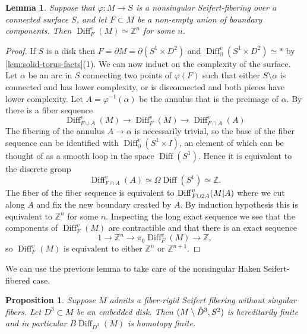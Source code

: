 \documentclass{amsart}
\theoremstyle{plain}
\newtheorem{prop}[thm]{Proposition}
\newtheorem{lem}[thm]{Lemma}
\theoremstyle{definition}
\DeclareMathOperator\Diff{Diff}
\newcommand{\interior}[1]{\smash{\mathring{#1}}}
\newcommand{\ca}{\smash{\mid}} %
\newcommand{\BDiff}{B\!\Diff}
\newcommand{\bbZ}{\mathbb{Z}}
\newcommand{\Z}{\mathbb{Z}}
\begin{document}
\begin{lem}\label{lem:Diff_S1^v-v2}
    Suppose that $\varphi\colon M\rightarrow S$ is a nonsingular Seifert-fibering over a connected surface $S$, and let $F \subset M$ be a non-empty union of boundary components.
    Then $\Diff_{F}^v(M) \simeq \Z^{n}$ for some $n$.
\end{lem}
\begin{proof}
    If $S$ is a disk then $F = \partial M=\partial (S^1\times D^2)$ and $\Diff_\partial^v(S^1 \times D^2) \simeq *$ by \cref{lem:solid-torus-facts}(1).
    We can now induct on the complexity of the surface.
    Let $\alpha$ be an arc in $S$ connecting two points of $\varphi(F)$ such that either $S \setminus \alpha$ is connected and has lower complexity, or is disconnected and both pieces have lower complexity.
    Let $A = \varphi^{-1}(\alpha)$ be the annulus that is the preimage of $\alpha$.
    By \cite[Corollary 3.8(ii)]{HKMR12} there is a fiber sequence
    \[
        \Diff^v_{F \cup A}(M) \longrightarrow \Diff_F^v(M) \longrightarrow \Diff_{F \cap A}^v(A)
    \]
    The fibering of the annulus $A \to \alpha$ is necessarily trivial, so the base of the fiber sequence can be identified with
    $\Diff_\partial^v(S^1 \times I)$,
    an element of which can be thought of as a smooth loop in the space $\Diff(S^1)$.
    Hence it is equivalent to the discrete group
    \[
        \Diff_{F \cap A}^v(A) \simeq \Omega \Diff(S^1) \simeq \bbZ.
    \]
    The fiber of the fiber sequence is equivalent to $\Diff_{F \cup 2A}^v(M \ca A)$ where we cut along $A$ and fix the new boundary created by $A$.
    By induction hypothesis this is equivalent to $\bbZ^n$ for some $n$.
    Inspecting the long exact sequence we see that the components of $\Diff_F^v(M)$ are contractible and that there is an exact sequence
    \[
        1 \to \bbZ^n \to \pi_0\Diff_F^v(M) \to \bbZ,
    \]
    so $\Diff_F^v(M)$ is equivalent to either $\bbZ^n$ or $\bbZ^{n+1}$.
\end{proof}
We can use the previous lemma to take care of the nonsingular Haken Seifert-fibered case.  
\begin{prop}\label{lem:Haken-SF-Nonsingular}
    Suppose $M$ admits a fiber-rigid Seifert fibering without singular fibers.
    Let $D^3\subset M$ be an embedded disk.
    Then $(M \setminus \interior{D}^3, S^2)$ is hereditarily finite and in particular
    $\BDiff_{D^3}(M)$ is homotopy finite.
\end{prop}
\end{document}
